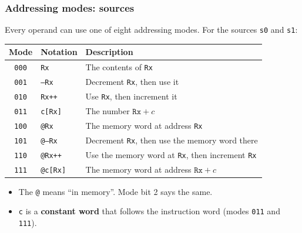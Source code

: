 \documentclass{beamer}
\newcommand{\code}[1]{\texttt{#1}}
\begin{document}
%
   \begin{frame}
    \frametitle{Addressing modes: sources}
    Every operand can use one of eight addressing modes. For the sources
    \code{s0} and \code{s1}:
    {\small
    \begin{center}
     \begin{tabular}{|c|l|l|}
      \hline
       Mode&Notation&Description\\
      \hline
       \code{000}&\code{Rx}&The contents of \code{Rx}\\
       \code{001}&\code{--Rx}&Decrement \code{Rx}, then use it\\
       \code{010}&\code{Rx++}&Use \code{Rx}, then increment it\\
       \code{011}&\code{c[Rx]}&The number $\code{Rx} + c$\\
       \code{100}&\code{@Rx}&The memory word at address \code{Rx}\\
       \code{101}&\code{@--Rx}&Decrement \code{Rx}, then use the memory
        word there\\
       \code{110}&\code{@Rx++}&Use the memory word at \code{Rx}, then
        increment \code{Rx}\\
       \code{111}&\code{@c[Rx]}&The memory word at address $\code{Rx} + c$\\
      \hline
     \end{tabular}
    \end{center}
    }
    \begin{itemize}
     \item The \code{@} means ``in memory''. Mode bit 2 says the same.
     \item \code{c} is a \textbf{constant word} that follows the
      instruction word (modes \code{011} and \code{111}).
    \end{itemize}
   \end{frame}
%
\end{document}
